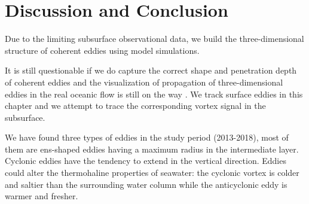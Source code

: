 \clearpage

\section{Discussion and Conclusion}

Due to the limiting subsurface observational data, we build the three-dimensional structure of coherent eddies using model simulations. 

It is still questionable if we do capture the correct shape and penetration depth of coherent eddies and the visualization of propagation of three-dimensional eddies in the real oceanic flow is still on the way \cite{liu2018gulf}. We track surface eddies in this chapter and we attempt to trace the corresponding vortex signal in the subsurface. 

We have found three types of eddies in the study period (2013-2018), most of them are ens-shaped eddies having a maximum radius in the intermediate layer. Cyclonic eddies have the tendency to extend in the vertical direction. Eddies could alter the thermohaline properties of seawater: the cyclonic vortex is colder and saltier than the surrounding water column while the anticyclonic eddy is warmer and fresher.


\newpage
